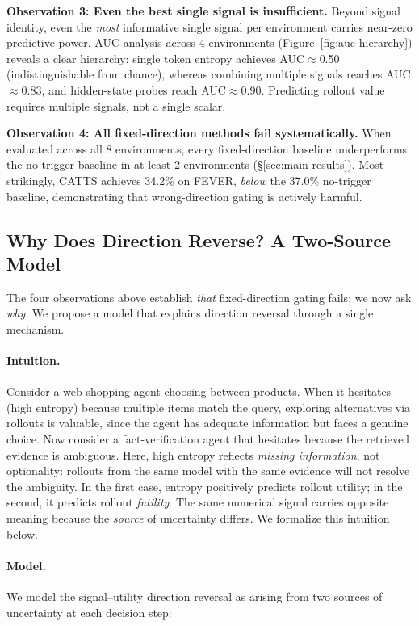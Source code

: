 \textbf{Observation 3: Even the best single signal is insufficient.}
Beyond signal identity, even the \emph{most} informative single
signal per environment carries near-zero predictive power. AUC
analysis across 4 environments (Figure~\ref{fig:auc-hierarchy})
reveals a clear hierarchy:
single token entropy achieves AUC${\approx}$0.50 (indistinguishable
from chance), whereas combining multiple signals reaches
AUC${\approx}$0.83, and hidden-state probes reach AUC${\approx}$0.90.
Predicting rollout value requires multiple signals, not a single
scalar.

\textbf{Observation 4: All fixed-direction methods fail systematically.}
When evaluated across all 8 environments, every fixed-direction
baseline underperforms the no-trigger baseline in at least 2
environments (\S\ref{sec:main-results}). Most strikingly, CATTS
achieves 34.2\% on FEVER, \emph{below} the 37.0\% no-trigger
baseline, demonstrating that wrong-direction gating is actively
harmful.


\subsection{Why Does Direction Reverse? A Two-Source Model}
\label{sec:toy-model}

The four observations above establish \emph{that} fixed-direction
gating fails; we now ask \emph{why}. We propose a model that
explains direction reversal through a single mechanism.

\paragraph{Intuition.}
Consider a web-shopping agent choosing between products. When it
hesitates (high entropy) because multiple items match the query,
exploring alternatives via rollouts is valuable, since the agent has
adequate information but faces a genuine choice. Now consider a
fact-verification agent that hesitates because the retrieved evidence
is ambiguous. Here, high entropy reflects \emph{missing information},
not optionality: rollouts from the same model with the same evidence
will not resolve the ambiguity. In the first case, entropy positively
predicts rollout utility; in the second, it predicts rollout
\emph{futility}. The same numerical signal carries opposite meaning
because the \emph{source} of uncertainty differs. We formalize this
intuition below.

\paragraph{Model.}
We model the signal--utility direction reversal as arising from two
sources of uncertainty at each decision step:

